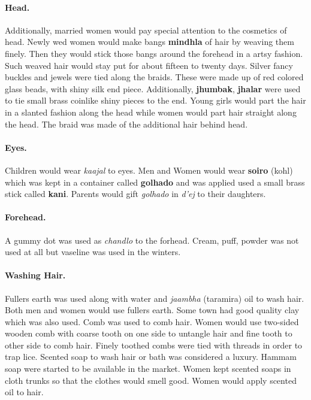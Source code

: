 \paragraph{Head.} Additionally, married women would pay special attention to
the cosmetics of head. Newly wed women would make bangs \textbf{mindhla} of
hair by weaving them finely. Then they would stick those bangs around the
forehead in a artsy fashion. Such weaved hair would stay put for about fifteen
to twenty days. Silver fancy buckles and jewels were tied along the braids.
These were made up of red colored glass beads, with shiny silk end piece.
Additionally, \textbf{jhumbak}, \textbf{jhalar} were used to tie small brass
coinlike shiny pieces to the end. Young girls would part the hair in a slanted
fashion along the head while women would part hair straight along the head. The
braid was made of the additional hair behind head.

\paragraph{Eyes.} Children would wear \textit{kaajal} to eyes. Men and Women
would wear \textbf{soiro} (kohl) which was kept in a container called
\textbf{golhado} and was applied used a small brass stick called \textbf{kani}.
Parents would gift \textit{golhado} in \textit{d'ej} to their daughters.

\paragraph{Forehead.} A gummy dot was used as \textit{chandlo} to the forhead.
Cream, puff, powder was not used at all but vaseline was used in the winters.

\paragraph{Washing Hair.} Fullers earth was used along with water and
\textit{jaambha} (taramira) oil to wash hair. Both men and women would use
fullers earth. Some town had good quality clay which was also used. Comb was
used to comb hair. Women would use two-sided wooden comb with coarse tooth on
one side to untangle hair and fine tooth to other side to comb hair. Finely
toothed combs were tied with threads in order to trap lice. Scented soap to
wash hair or bath was considered a luxury. Hammam soap were started to be
available in the market. Women kept scented soaps in cloth trunks so that the
clothes would smell good. Women would apply scented oil to hair.

